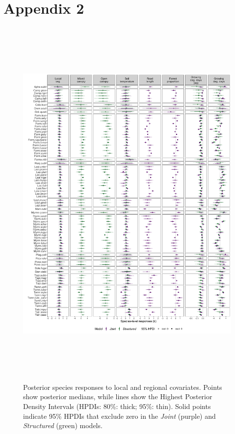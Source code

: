 \documentclass[preprint,review,times,12pt,3p]{elsarticle}
\begin{document}
\newpage

\section{Appendix 2}

\begin{figure}
	\centering\includegraphics[height=7.5in]{ms/1_Ecography/1/figs/b_opt_byParam.png}
	\caption{\label{fig:b_byParam} Posterior species responses to local and regional covariates. Points show posterior medians, while lines show the Highest Posterior Density Intervals (HPDIs: 80\%: thick; 95\%: thin). Solid points indicate 95\% HPDIs that exclude zero in the \emph{Joint} (purple) and \emph{Structured} (green) models.}
\end{figure}
\end{document}

